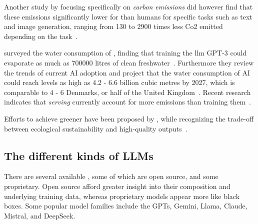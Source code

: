 Another study by \citeauthor{llmCarbon} focusing specifically on \textit{carbon emissions} did
however find that these emissions significantly lower for  than humans for specific
tasks such as text and image generation, ranging from \num{130} to \num{2900} times less Co2 emitted
depending on the task~\cite[1]{llmCarbon}.

\citeauthor{thirstyLlm} surveyed the water consumption of , finding that training the
\acrshort{llm} \textsc{GPT-3} could evaporate as much as \num{700000} litres of clean
freshwater~\cite[1]{thirstyLlm}. Furthermore they review the trends of current AI adoption and
project that the water consumption of AI could reach levels as high as \num{4.2} - \num{6.6} billion
cubic metres by \num{2027}, which is comparable to \num{4} - \num{6} Denmarks, or half of the United
Kingdom~\cite[1]{thirstyLlm}. Recent research indicates that \textit{serving} 
currently account for more emissions than training them~\cite[37]{sustainableLlmServing}.

Efforts to achieve greener  have been proposed by \citeauthor{sproutGreenLlm}, while
recognizing the trade-off between ecological sustainability and high-quality
outputs~\cite[21799]{sproutGreenLlm}.




\subsection{The different kinds of LLMs}\label{sec:llmJungle}

There are several available , some of which are open source, and some proprietary.
Open source  afford greater insight into their composition and underlying training
data, whereas proprietary models appear more like black boxes. Some popular model families include
the GPTs, Gemini, Llama, Claude, Mistral, and DeepSeek.


